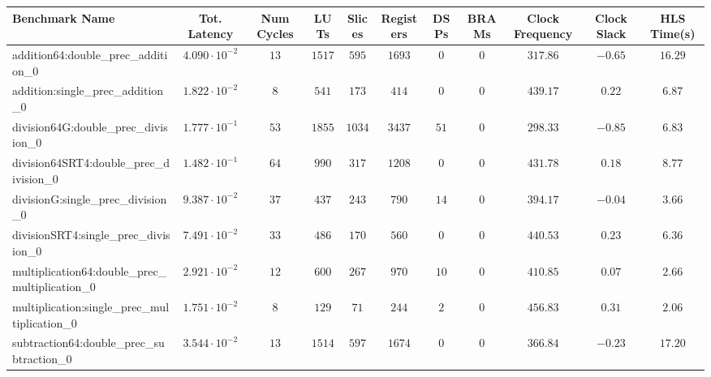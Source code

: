 \begin{tabular}{|l|c|c|c|c|c|c|c|c|c|c|}
\hline
Benchmark Name                                   & Tot. Latency            & Num Cycles & LUTs     & Slices   & Registers & DSPs   & BRAMs & Clock Frequency & Clock Slack & HLS Time(s) \\
\hline
addition64:double\_prec\_addition\_0             & $ 4.090 \cdot 10^{-2} $ & $ 13     $ & $ 1517 $ & $ 595  $ & $ 1693  $ & $ 0  $ & $ 0 $ & $ 317.86      $ & $ -0.65   $ & $ 16.29   $ \\
addition:single\_prec\_addition\_0               & $ 1.822 \cdot 10^{-2} $ & $ 8      $ & $ 541  $ & $ 173  $ & $ 414   $ & $ 0  $ & $ 0 $ & $ 439.17      $ & $ 0.22    $ & $ 6.87    $ \\
division64G:double\_prec\_division\_0            & $ 1.777 \cdot 10^{-1} $ & $ 53     $ & $ 1855 $ & $ 1034 $ & $ 3437  $ & $ 51 $ & $ 0 $ & $ 298.33      $ & $ -0.85   $ & $ 6.83    $ \\
division64SRT4:double\_prec\_division\_0         & $ 1.482 \cdot 10^{-1} $ & $ 64     $ & $ 990  $ & $ 317  $ & $ 1208  $ & $ 0  $ & $ 0 $ & $ 431.78      $ & $ 0.18    $ & $ 8.77    $ \\
divisionG:single\_prec\_division\_0              & $ 9.387 \cdot 10^{-2} $ & $ 37     $ & $ 437  $ & $ 243  $ & $ 790   $ & $ 14 $ & $ 0 $ & $ 394.17      $ & $ -0.04   $ & $ 3.66    $ \\
divisionSRT4:single\_prec\_division\_0           & $ 7.491 \cdot 10^{-2} $ & $ 33     $ & $ 486  $ & $ 170  $ & $ 560   $ & $ 0  $ & $ 0 $ & $ 440.53      $ & $ 0.23    $ & $ 6.36    $ \\
multiplication64:double\_prec\_multiplication\_0 & $ 2.921 \cdot 10^{-2} $ & $ 12     $ & $ 600  $ & $ 267  $ & $ 970   $ & $ 10 $ & $ 0 $ & $ 410.85      $ & $ 0.07    $ & $ 2.66    $ \\
multiplication:single\_prec\_multiplication\_0   & $ 1.751 \cdot 10^{-2} $ & $ 8      $ & $ 129  $ & $ 71   $ & $ 244   $ & $ 2  $ & $ 0 $ & $ 456.83      $ & $ 0.31    $ & $ 2.06    $ \\
subtraction64:double\_prec\_subtraction\_0       & $ 3.544 \cdot 10^{-2} $ & $ 13     $ & $ 1514 $ & $ 597  $ & $ 1674  $ & $ 0  $ & $ 0 $ & $ 366.84      $ & $ -0.23   $ & $ 17.20   $ \\

\end{tabular}
